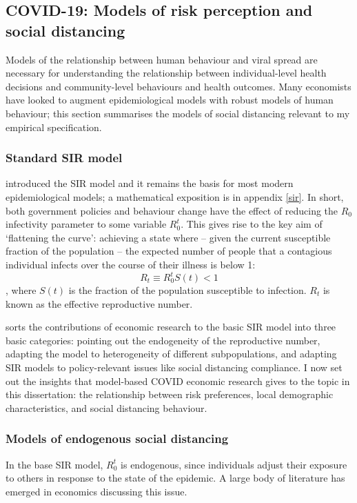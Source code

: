 \documentclass{article}
\begin{document}
\subsection{COVID-19: Models of risk perception and social distancing} 
Models of the relationship between human behaviour and viral spread are necessary for understanding the relationship between individual-level health decisions and community-level behaviours and health outcomes. Many economists have looked to augment epidemiological models with robust models of human behaviour; this section summarises the models of social distancing relevant to my empirical specification.
\subsubsection{Standard SIR model}
\textcite{kermackContributionMathematicalTheory1927} introduced the SIR model and it remains the basis for most modern epidemiological models; a mathematical exposition is in appendix \ref{sir}.  In short, both government policies and behaviour change have the effect of reducing the \(R_0\) infectivity parameter to some variable \(R^t_0\). This gives rise to the key aim of `flattening the curve': achieving a state where -- given the current susceptible fraction of the population -- the expected number of people that a contagious individual infects over the course of their illness is below 1:
\begin{equation}
    R_t \equiv R^t_0 S(t) < 1
\end{equation}, where \(S(t)\) is the fraction of the population susceptible to infection. \(R_t\) is known as the effective reproductive number.

\textcite{averyEconomistGuideEpidemiology2020} sorts the contributions of economic research to the basic SIR model into three basic categories: pointing out the endogeneity of the reproductive number, adapting the model to heterogeneity of different subpopulations, and adapting SIR models to policy-relevant issues like social distancing compliance. I now set out the insights that model-based COVID economic research gives to the topic in this dissertation: the relationship between risk preferences, local demographic characteristics, and social distancing behaviour.

\subsubsection{Models of endogenous social distancing}
In the base SIR model, \(R^t_0\) is endogenous, since individuals adjust their exposure to others in response to the state of the epidemic. A large body of literature has emerged in economics discussing this issue. 
\end{document}
